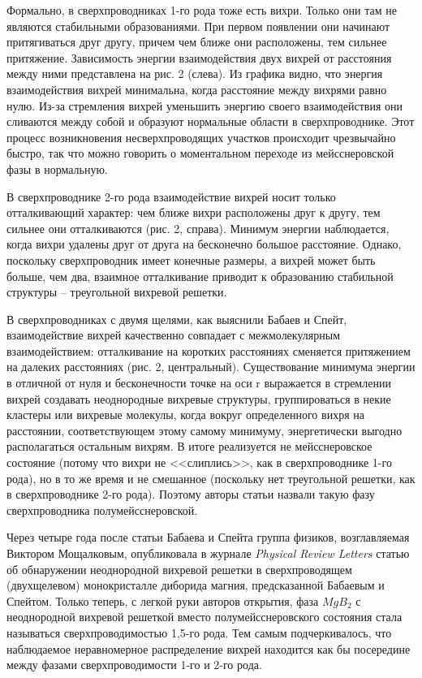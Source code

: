 Формально, в сверхпроводниках 1-го рода тоже есть вихри. Только они там не 
являются стабильными образованиями. При первом появлении они начинают 
притягиваться друг другу, причем чем ближе они расположены, тем сильнее 
притяжение. Зависимость энергии взаимодействия двух вихрей от расстояния между 
ними представлена на рис. 2 (слева). Из графика видно, что энергия 
взаимодействия вихрей минимальна, когда расстояние между вихрями равно нулю. 
Из-за стремления вихрей уменьшить энергию своего взаимодействия они сливаются 
между собой и образуют нормальные области в сверхпроводнике. Этот процесс 
возникновения несверхпроводящих участков происходит чрезвычайно быстро, так 
что можно говорить о моментальном переходе из мейсснеровской фазы в нормальную.

В сверхпроводнике 2-го рода взаимодействие вихрей носит только отталкивающий 
характер: чем ближе вихри расположены друг к другу, тем сильнее они 
отталкиваются (рис. 2, справа). Минимум энергии наблюдается, когда вихри 
удалены друг от друга на бесконечно большое расстояние. Однако, поскольку 
сверхпроводник имеет конечные размеры, а вихрей может быть больше, чем два, 
взаимное отталкивание приводит к образованию стабильной структуры -- 
треугольной вихревой решетки.

В сверхпроводниках с двумя щелями, как выяснили Бабаев и Спейт, взаимодействие 
вихрей качественно совпадает с межмолекулярным взаимодействием: отталкивание 
на коротких расстояниях сменяется притяжением на далеких расстояниях 
(рис. 2, центральный). Существование минимума энергии в отличной от нуля и 
бесконечности точке на оси r выражается в стремлении вихрей создавать 
неоднородные вихревые структуры, группироваться в некие кластеры или вихревые 
молекулы, когда вокруг определенного вихря на расстоянии, соответствующем 
этому самому минимуму, энергетически выгодно располагаться остальным вихрям. 
В итоге реализуется не мейсснеровское состояние (потому что вихри не 
<<слиплись>>, как в сверхпроводнике 1-го рода), но в то же время и не 
смешанное (поскольку нет треугольной решетки, как в сверхпроводнике 2-го 
рода). Поэтому авторы статьи назвали такую фазу сверхпроводника 
полумейсснеровской.

Через четыре года после статьи Бабаева и Спейта группа физиков, возглавляемая 
Виктором Мощалковым, опубликовала в журнале \emph{Physical Review Letters} 
статью об обнаружении неоднородной вихревой решетки в сверхпроводящем 
(двухщелевом) монокристалле диборида магния, предсказанной Бабаевым и Спейтом. 
Только теперь, с легкой руки авторов открытия, фаза \( MgB_2 \) с неоднородной 
вихревой решеткой вместо полумейсснеровского состояния стала называться 
сверхпроводимостью 1,5-го рода. Тем самым подчеркивалось, что наблюдаемое 
неравномерное распределение вихрей находится как бы посередине между фазами 
сверхпроводимости 1-го и 2-го рода.

